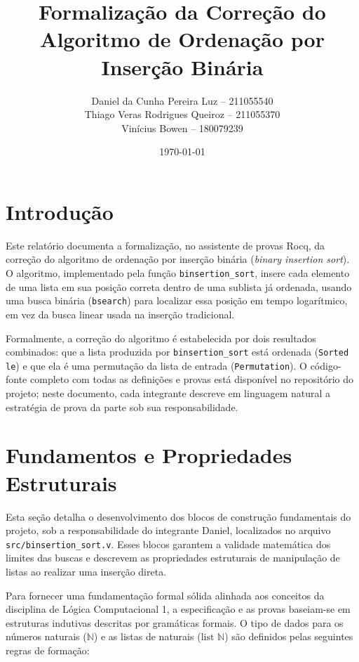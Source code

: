 \documentclass{article}
\title{\textbf{Formalização da Correção do Algoritmo de Ordenação por Inserção Binária}}
\author{
  Daniel da Cunha Pereira Luz \textsc{-- 211055540} \\
  Thiago Veras Rodrigues Queiroz \textsc{-- 211055370} \\
  Vinícius Bowen \textsc{-- 180079239}
}
\date{\today}
\begin{document}
\maketitle

\section{Introdução}
Este relatório documenta a formalização, no assistente de provas Rocq, da correção do algoritmo de ordenação por inserção binária (\emph{binary insertion sort}). O algoritmo, implementado pela função \texttt{binsertion\_sort}, insere cada elemento de uma lista em sua posição correta dentro de uma sublista já ordenada, usando uma busca binária (\texttt{bsearch}) para localizar essa posição em tempo logarítmico, em vez da busca linear usada na inserção tradicional.

Formalmente, a correção do algoritmo é estabelecida por dois resultados combinados: que a lista produzida por \texttt{binsertion\_sort} está ordenada (\texttt{Sorted le}) e que ela é uma permutação da lista de entrada (\texttt{Permutation}). O código-fonte completo com todas as definições e provas está disponível no repositório do projeto; neste documento, cada integrante descreve em linguagem natural a estratégia de prova da parte sob sua responsabilidade.

\section{Fundamentos e Propriedades Estruturais} \label{sec:daniel}
Esta seção detalha o desenvolvimento dos blocos de construção fundamentais do projeto, sob a responsabilidade do integrante Daniel, localizados no arquivo \texttt{src/binsertion\_sort.v}. Esses blocos garantem a validade matemática dos limites das buscas e descrevem as propriedades estruturais de manipulação de listas ao realizar uma inserção direta.

Para fornecer uma fundamentação formal sólida alinhada aos conceitos da disciplina de Lógica Computacional 1, a especificação e as provas baseiam-se em estruturas indutivas descritas por gramáticas formais. O tipo de dados para os números naturais ($\mathbb{N}$) e as listas de naturais ($\text{list } \mathbb{N}$) são definidos pelas seguintes regras de formação:
\end{document}

